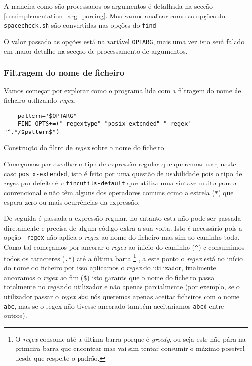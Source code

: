 A maneira como são processados os argumentos é detalhada na secção
\ref{sec:implementation_arg_parsing}. Mas vamos analisar como as opções do
\Verb|spacecheck.sh| são convertidas nas opções do \Verb|find|.

O valor passado as opções está na variável \Verb|OPTARG|, mais uma vez isto será
falado em maior detalhe na secção de processamento de argumentos.

\subsubsection{Filtragem do nome de ficheiro}

Vamos começar por explorar como o programa lida com a filtragem do nome de
ficheiro utilizando \emph{regex}.

\begin{listing}[H]
	\centering
	\begin{verbatim}
    pattern="$OPTARG"
    FIND_OPTS+=("-regextype" "posix-extended" "-regex" "^.*/$pattern$")
  \end{verbatim}
	\cprotect\caption{Construção do filtro de \emph{regex} sobre o nome do ficheiro}
\end{listing}

Começamos por escolher o tipo de expressão regular que queremos usar, neste
caso \Verb|posix-extended|, isto é feito por uma questão de usabilidade pois o
tipo de \emph{regex} por defeito é o \Verb|findutils-default| que utiliza uma
sintaxe muito pouco convencional e não têm alguns dos operadores comuns
\cite{find_man} como a estrela (\Verb|*|) que espera zero ou mais ocurrências
da expressão.

De seguida é passada a expressão regular, no entanto esta não pode ser passada
diretamente e precisa de algum código extra a sua volta. Isto é necessário pois
a opção \Verb|-regex| não aplica o \emph{regex} ao nome do ficheiro mas sim ao
caminho todo. Como tal começamos por ancorar o \emph{regex} ao ínicio do caminho
(\Verb|^|) e consumimos todos os caracteres (\Verb|.*|) até a última barra
\footnote{O \emph{regex} consome até a última barra porque é \emph{greedy}, ou
	seja este não pára na primeira barra que encontrar mas vai sim tentar consumir
	o máximo possível desde que respeite o padrão.}
, a este ponto o \emph{regex} está no início do nome do ficheiro por isso
aplicamos o \emph{regex} do utilizador, finalmente ancoramos o \emph{regex} ao
fim (\Verb|$|) isto garante que o nome do ficheiro passa totalmente no
\emph{regex} do utilizador e não apenas parcialmente (por exemplo, se o
utilizador passar o \emph{regex} \Verb|abc| nós queremos apenas aceitar
ficheiros com o nome \Verb|abc|, mas se o regex não tivesse ancorado também
aceitaríamos \Verb|abcd| entre outros).

